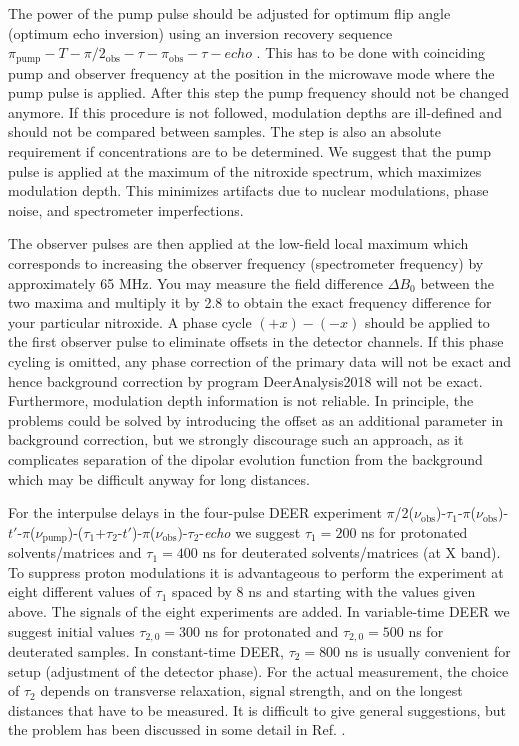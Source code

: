 \documentclass{article}
\begin{document}
The power of the pump pulse should be adjusted for optimum flip angle (optimum echo inversion) using an inversion recovery sequence $\pi_{\mathrm{pump}}-T-\pi/2_\mathrm{obs}-\tau-\pi_{\mathrm{obs}}-\tau-echo$ . This has to be done with coinciding pump and observer frequency at the position in the microwave mode where the pump pulse is applied. After this step the pump frequency should not be changed anymore. If this procedure is not followed, modulation depths are ill-defined and should not be compared between samples. The step is also an absolute requirement if concentrations are to be determined. We suggest that the pump pulse is applied at the maximum of the nitroxide spectrum, which maximizes modulation depth. This minimizes artifacts due to nuclear modulations, phase noise, and spectrometer imperfections.

The observer pulses are then applied at the low-field local maximum which corresponds to increasing the observer frequency (spectrometer frequency) by approximately 65 MHz. You may measure the field difference $\Delta B_{0}$ between the two maxima and multiply it by 2.8 to obtain the exact frequency difference for your particular nitroxide. A phase cycle $(+x)-(-x)$ should be applied to the first observer pulse to eliminate offsets in the detector channels. If this phase cycling is omitted, any phase correction of the primary data will not be exact and hence background correction by program DeerAnalysis2018 will not be exact. Furthermore, modulation depth information is not reliable. In principle, the problems could be solved by introducing the offset as an additional parameter in background correction, but we strongly discourage such an approach, as it complicates separation of the dipolar evolution function from the background which may be difficult anyway for long distances.

For the interpulse delays in the four-pulse DEER experiment $\pi$/2($\nu_{\mathrm{obs}}$)-$\tau_{1}$-$\pi$($\nu_{\mathrm{obs}}$)-$t'$-$\pi$($\nu_{\mathrm{pump}}$)-($\tau_{1}$+$\tau_{2}$-$t'$)-$\pi$($\nu_{\mathrm{obs}}$)-$\tau_{2}$-{\em echo} we suggest $\tau_{1} = 200$ ns for protonated solvents/matrices and $\tau_{1} = 400$ ns for deuterated solvents/matrices (at X band). To suppress proton modulations it is advantageous to perform the experiment at eight different values of $\tau_{1}$ spaced by 8 ns and starting with the values given above. The signals of the eight experiments are added. In variable-time DEER \cite{jeschke2004b} we suggest initial values $\tau_{2,0}= 300$ ns for protonated and $\tau_{2,0}= 500$ ns for deuterated samples. In constant-time DEER, $\tau_{2} = 800$ ns is usually convenient for setup (adjustment of the detector phase). For the actual measurement, the choice of $\tau_{2}$ depends on transverse relaxation, signal strength, and on the longest distances that have to be measured. It is difficult to give general suggestions, but the problem has been discussed in some detail in Ref. \cite{jeschke2004b}.
\end{document}
